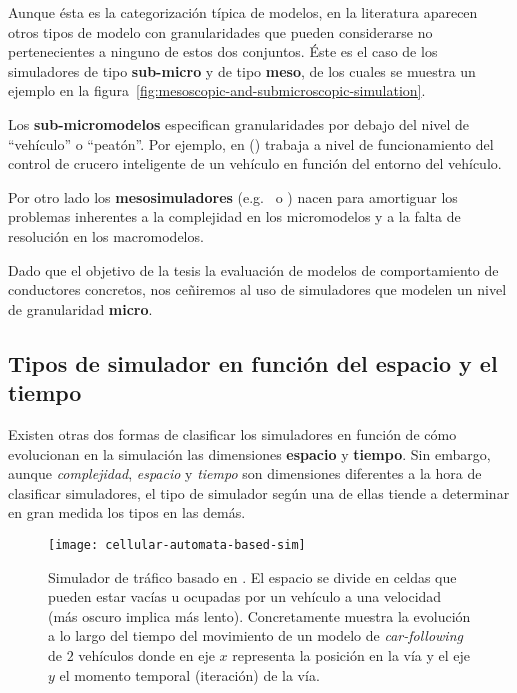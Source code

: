 Aunque ésta es la categorización típica de modelos, en la literatura aparecen otros tipos de modelo con granularidades que pueden considerarse no pertenecientes a ninguno de estos dos conjuntos. Éste es el caso de los simuladores de tipo \textbf{sub-micro} y de tipo \textbf{meso}, de los cuales se muestra un ejemplo en la figura~\ref{fig:mesoscopic-and-submicroscopic-simulation}.

Los \textbf{sub-micromodelos} especifican granularidades por debajo del nivel de \enquote{vehículo} o \enquote{peatón}. Por ejemplo, en (\cite{Minderhoud1999}) trabaja a nivel de funcionamiento del control de crucero inteligente de un vehículo en función del entorno del vehículo.

Por otro lado los \textbf{mesosimuladores} (e.g.~\cite{munoz2001integrated} o \cite{casas2011need}) nacen para amortiguar los problemas inherentes a la complejidad en los micromodelos y a la falta de resolución en los macromodelos.

Dado que el objetivo de la tesis la evaluación de modelos de comportamiento de conductores concretos, nos ceñiremos al uso de simuladores que modelen un nivel de granularidad \textbf{micro}.

\subsection{Tipos de simulador en función del espacio y el tiempo}

Existen otras dos formas de clasificar los simuladores en función de cómo evolucionan en la simulación las dimensiones \textbf{espacio} y  \textbf{tiempo}. Sin embargo, aunque \textit{complejidad}, \textit{espacio} y \textit{tiempo} son dimensiones diferentes a la hora de clasificar simuladores, el tipo de simulador según una de ellas tiende a determinar en gran medida los tipos en las demás.

\begin{figure}
	\centering
	\texttt{[image: cellular-automata-based-sim]}
	\caption[Ejemplo de simulador basado en ]{Simulador de tráfico basado en . El espacio se divide en celdas que pueden estar vacías u ocupadas por un vehículo a una velocidad (más oscuro implica más lento). Concretamente muestra la evolución a lo largo del tiempo del movimiento de un modelo de \textit{car-following} de $2$ vehículos donde en eje $x$ representa la posición en la vía y el eje $y$ el momento temporal (iteración) de la vía.}
	\label{fig:cellular-automata-based-sim}
\end{figure}

